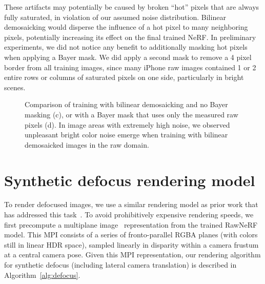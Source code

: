 These artifacts may potentially be caused by broken ``hot'' pixels that are always fully saturated, in violation of our assumed noise distribution. Bilinear demosaicking would disperse the influence of a hot pixel to many neighboring pixels, potentially increasing its effect on the final trained NeRF. In preliminary experiments, we did not notice any benefit to additionally masking hot pixels when applying a Bayer mask. We did apply a second mask to remove a 4 pixel border from all training images, since many iPhone raw images contained 1 or 2 entire rows or columns of saturated pixels on one side, particularly in bright scenes.

\begin{figure}
    \centering
{}
    \caption{Comparison of training with bilinear demosaicking and no Bayer masking (c), or with a Bayer mask that uses only the measured raw pixels (d). In image areas with extremely high noise, we observed unpleasant bright color noise emerge when training with bilinear demosaicked images in the raw domain.}
    \label{fig:demosaic}
\end{figure}



\section{Synthetic defocus rendering model}

To render defocused images, we use a similar rendering model as prior work that has addressed this task~\cite{barron2015stereo,wadhwa2018defocus,zhang2019defocus}. To avoid prohibitively expensive rendering speeds, we first precompute a multiplane image~\cite{zhou18stereomag} representation from the trained RawNeRF model. This MPI consists of a series of fronto-parallel RGBA planes (with colors still in linear HDR space), sampled linearly in disparity within a camera frustum at a central camera pose. Given this MPI representation, our rendering algorithm for synthetic defocus (including lateral camera translation) is described in Algorithm~\ref{alg:defocus}.

